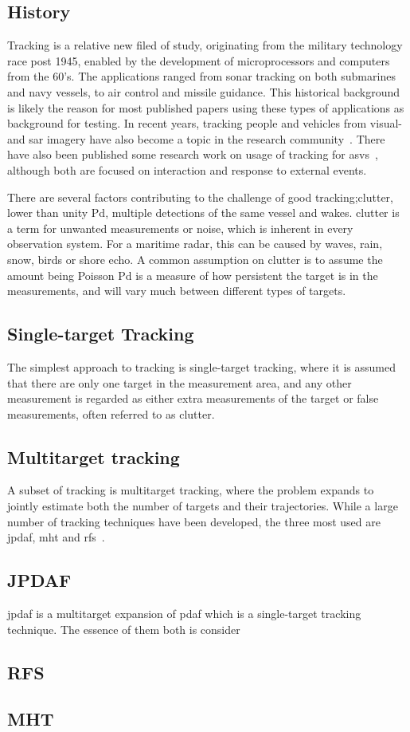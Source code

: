 \subsection{History}
Tracking is a relative new filed of study, originating from the military technology race post 1945, enabled by the development of microprocessors and computers from the 60's. The applications ranged from sonar tracking on both submarines and navy vessels, to air control and missile guidance. This historical background is likely the reason for most published papers using these types of applications as background for testing. In recent years, tracking people and vehicles from visual- and \gls{sar} imagery have also become a topic in the research community~\cite{Carthel2007,Carthel2007a,Coraluppi2000}. There have also been published some research work on usage of tracking for \glspl{asv}~\cite{Wolf2010,Svec2014}, although both are focused on interaction and response to external events.

There are several factors contributing to the challenge of good tracking;\gls{clutter}, lower than unity \gls{Pd}, multiple detections of the same vessel and wakes. \Gls{clutter} is a term for unwanted measurements or noise, which is inherent in every observation system. For a maritime radar, this can be caused by waves, rain, snow, birds or shore echo. A common assumption on clutter is to assume the amount being Poisson \gls{Pd} is a measure of how persistent the target is in the measurements, and will vary much  between different types of targets. 

\subsection{Single-target Tracking}
The simplest approach to tracking is single-target tracking, where it is assumed that there are only one target in the measurement area, and any other measurement is regarded as either extra measurements of the target or false measurements, often referred to as \gls{clutter}.

\subsection{Multitarget tracking}
A subset of tracking is multitarget tracking, where the problem expands to jointly estimate both the number of targets and their trajectories. While a large number of tracking techniques have been developed, the three most used are \gls{jpdaf}, \gls{mht} and \gls{rfs}~\cite{Vo2015}.

\subsection{JPDAF}
\gls{jpdaf} is a multitarget expansion of \gls{pdaf} which is a single-target tracking technique. The essence of them both is consider 

\subsection{RFS}

\subsection{MHT}
